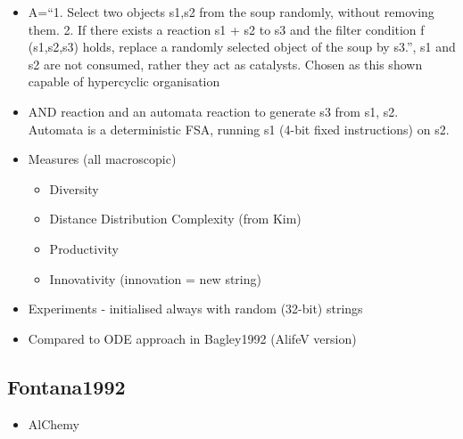 \begin{itemize}
			\item
			
			A=``1. Select two objects s1,s2 from the soup randomly, without
			removing them. 2. If there exists a reaction s1 + s2 to s3 and the
			filter condition f (s1,s2,s3) holds, replace a randomly selected
			object of the soup by s3.'', s1 and s2 are not consumed, rather they
			act as catalysts. Chosen as this shown capable of hypercyclic
			organisation
			
			\item
			
			AND reaction and an automata reaction to generate s3 from s1, s2.
			Automata is a deterministic FSA, running s1 (4-bit fixed instructions)
			on s2.
			
			\item
			
			Measures (all macroscopic)
			
			
			\begin{itemize}
				\item
				
				Diversity
				
				\item
				
				Distance Distribution Complexity (from Kim)
				
				\item
				
				Productivity
				
				\item
				
				Innovativity (innovation = new string)
				
			\end{itemize}
			\item
			
			Experiments - initialised always with random (32-bit) strings
			
			\item
			
			Compared to ODE approach in Bagley1992 (AlifeV version)
			
		\end{itemize}
		
		\hypertarget{fontana1992}{\subsection{Fontana1992}\label{fontana1992}}
		
		\begin{itemize}
			\item
			
			AlChemy
			
		\end{itemize}
		
